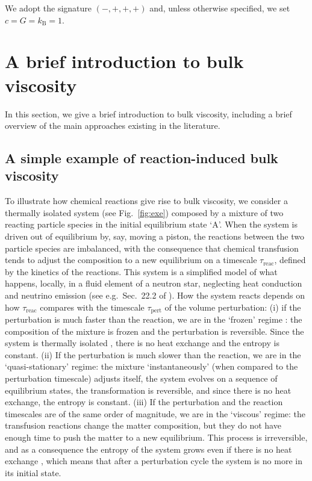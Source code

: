 \documentclass[aps,prd,twocolumn,a4paper,floatfix,nofootbib,superscriptaddress,nofootinbib]{revtex4}
\begin{document}
We adopt the signature $(-,+,+,+)$ and, unless otherwise specified, we set $c=G=k_\mathrm{B}=1$.

\section{A brief introduction to bulk viscosity}
\label{sec:intro-bulk}

In this section, we give a brief introduction to bulk viscosity, including
a brief overview of the main approaches existing in the literature.

\subsection{A simple example of reaction-induced bulk viscosity}

To illustrate how chemical reactions give rise to bulk viscosity, we
consider a thermally isolated system (see Fig.~\ref{fig:exe}) composed by a
mixture of two reacting particle species in the initial equilibrium state `A'.
When the system is driven out of equilibrium by, say, moving a piston, the reactions 
between the two particle species are imbalanced, with the consequence that chemical
transfusion tends to adjust the composition to a new equilibrium on a timescale
$\tau_\mathrm{reac}$, defined by the kinetics of the reactions.  
This system is a simplified model of what happens, locally, in a fluid
element of a neutron star, neglecting heat conduction and neutrino emission
(see e.g.~Sec.~22.2 of \citet{MTW_book}).  How the system reacts depends on how
$\tau_\mathrm{reac}$ compares with the timescale $\tau_\mathrm{pert}$ of the
volume perturbation: (i) if the perturbation is much faster than the reaction,
we are in the `frozen' regime \citep{haensel_frozen_2002}: the composition of the mixture is frozen and the perturbation is reversible. Since the system is thermally isolated
\cite{Landau5}, there is no heat exchange and the entropy is constant. (ii) If
the perturbation is much slower than the reaction, we are in the
`quasi-stationary' regime: the mixture `instantaneously' (when compared to the
perturbation timescale) adjusts itself, the
system evolves on a sequence of equilibrium states, the transformation is
reversible, and since there is no heat exchange, the entropy is constant. (iii)
If the perturbation and the reaction timescales are of the same order of
magnitude, we are in the `viscous' regime: the transfusion reactions change the
matter composition, but they do not have enough time to push the matter to a
new equilibrium.  This process is irreversible, and as a consequence the
entropy of the system grows even if there is no heat exchange
\cite{Jaynes1965}, which means that after a perturbation cycle the system is no more
in its initial state.
\end{document}
